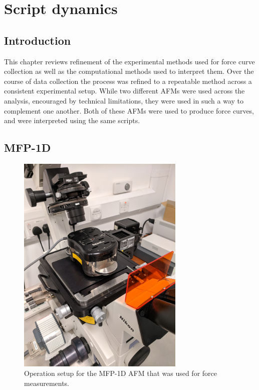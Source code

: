 



\chapter{Script dynamics}

\section{Introduction}

This chapter reviews refinement of the experimental methods used for force curve collection as well as the computational methods used to interpret them. Over the course of data collection the process was refined to a repeatable method across a consistent experimental setup. While two different AFMs were used across the analysis, encouraged by technical limitations, they were used in such a way to complement one another. Both of these AFMs were used to produce force curves, and were interpreted using the same scripts.

\section{MFP-1D} %

\begin{figure}[h!]     %
        \begin{center}
          \includegraphics[width=80mm]{chapter2/forceAFM.jpg}
\end{center}
\caption{Operation setup for the MFP-1D AFM that was used for force measurements.}
\label{fig:forceAFM.jpg}                 %
\end{figure}

